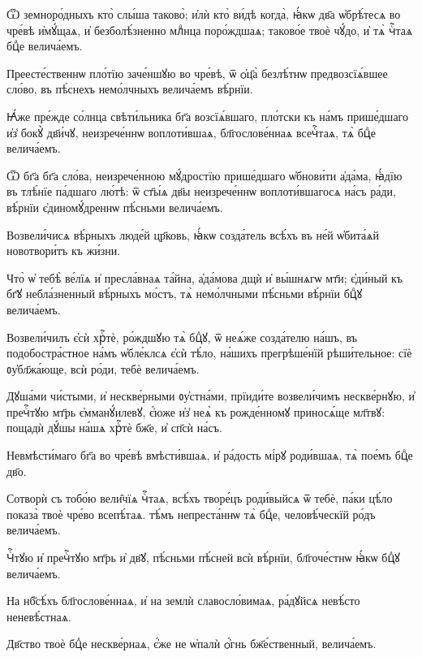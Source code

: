 \hKv Ѿ земноро́дныхъ кто̀ слы́ша таково̀; и҆лѝ кто̀ ви́дѣ  когда̀, ꙗ҆́кѡ дв҃а ѡ҆брѣ́тесѧ во чре́вѣ и҆мꙋ́щаѧ, и҆  безболѣ́зненно млⷣнца поро́ждшаѧ; таково́е твоѐ чꙋ́до, и҆  тѧ̀ чⷭ҇таѧ бцⷣе велича́емъ. 
%

\hKv Преесте́ственнѡ пло́тїю заче́ншꙋю во чре́вѣ, ѿ ѻ҆ц҃а̀  безлѣ́тнѡ предвозсїѧ́вшее сло́во, въ пѣ́снехъ немо́лчныхъ  велича́емъ вѣ́рнїи. 
%

\hKv Ꙗ҆́же пре́жде со́лнца свѣти́льника  бг҃а возсїѧ́вшаго, пло́тски къ на́мъ прише́дшаго и҆з̾ бокꙋ̀  дв҃и́чꙋ, неизрече́ннѡ воплоти́вшаѧ, бл҃гослове́ннаѧ  всечⷭ҇таѧ, тѧ̀ бцⷣе велича́емъ. 

\hKv Ѿ бг҃а бг҃а сло́ва, неизрече́нною мꙋ́дростїю прише́дшаго  ѡ҆бнови́ти а҆да́ма, ꙗ҆́дїю въ тлѣ́нїе па́дшаго лю́тѣ: ѿ  ст҃ы́ѧ дв҃ы неизрече́ннѡ воплоти́вшагосѧ на́съ ра́ди,  вѣ́рнїи є҆диномꙋ́дреннѡ пѣ́сньми велича́емъ. 

\hKv Возвели́чисѧ вѣ́рныхъ люде́й цр҃ковь, ꙗ҆́кѡ созда́тель  всѣ́хъ въ не́й ѡ҆бита́ѧй новотвори́тъ къ жи́зни.  

\hKv Что̀ ѡ҆ тебѣ̀ ве́лїѧ и҆ пресла́внаѧ та́йна, а҆да́мова дщѝ  и҆ вы́шнѧгѡ мт҃и; є҆ди́ный къ бг҃ꙋ небла́зненный вѣ́рныхъ  мо́стъ, тѧ̀ немо́лчными пѣ́сньми вѣ́рнїи бцⷣꙋ велича́емъ. 

\hKv Возвели́чилъ є҆сѝ хрⷭ҇тѐ, ро́ждшꙋю тѧ̀ бцⷣꙋ, ѿ неѧ́же  созда́телю на́шъ, въ подобостра́стное на́мъ ѡ҆бле́клсѧ  є҆сѝ тѣ́ло, на́шихъ прегрѣше́нїй рѣши́тельное: сїѐ  ᲂу҆бл҃жа́юще, всѝ ро́ди, тебѐ велича́емъ. 

\hKv Дꙋша́ми чи́стыми, и҆ нескве́рными ᲂу҆стна́ми, прїиди́те  возвели́чимъ нескве́рнꙋю, и҆ пречⷭ҇тꙋю мт҃рь є҆мманꙋ́илевꙋ,  є҆́юже и҆з̾ неѧ̀ къ рожде́нномꙋ приносѧ́ще мл҃твꙋ: пощадѝ  дꙋ́шы на́шѧ хрⷭ҇тѐ бж҃е, и҆ сп҃сѝ на́съ. 

\hKv Невмѣсти́маго бг҃а во чре́вѣ вмѣсти́вшаѧ, и҆ ра́дость  мі́рꙋ роди́вшаѧ, тѧ̀ пое́мъ бцⷣе дв҃о. 

\hKv Сотворѝ съ тобо́ю вели̑чїѧ чⷭ҇таѧ, всѣ́хъ творе́цъ  роди́выйсѧ ѿ тебѐ, па́ки цѣ́ло показа̀ твоѐ чре́во  всепѣ́таѧ. тѣ́мъ непреста́ннѡ тѧ̀ бцⷣе, человѣ́ческїй  ро́дъ велича́емъ.  

\hKv Чⷭ҇тꙋю и҆ пречⷭ҇тꙋю мт҃рь и҆ дв҃ꙋ, пѣ́сньми пѣ́сней всѝ  вѣ́рнїи, бл҃гоче́стнѡ ꙗ҆́кѡ бцⷣꙋ велича́емъ. 

\hKv На нб҃сѣ́хъ бл҃гослове́ннаѧ, и҆ на землѝ славосло́вимаѧ,  ра́дꙋйсѧ невѣ́сто неневѣ́стнаѧ.  

\hKv Дв҃ство твоѐ бцⷣе нескве́рнаѧ, є҆́же не ѡ҆палѝ ѻ҆́гнь  бж҃е́ственный, велича́емъ. 

